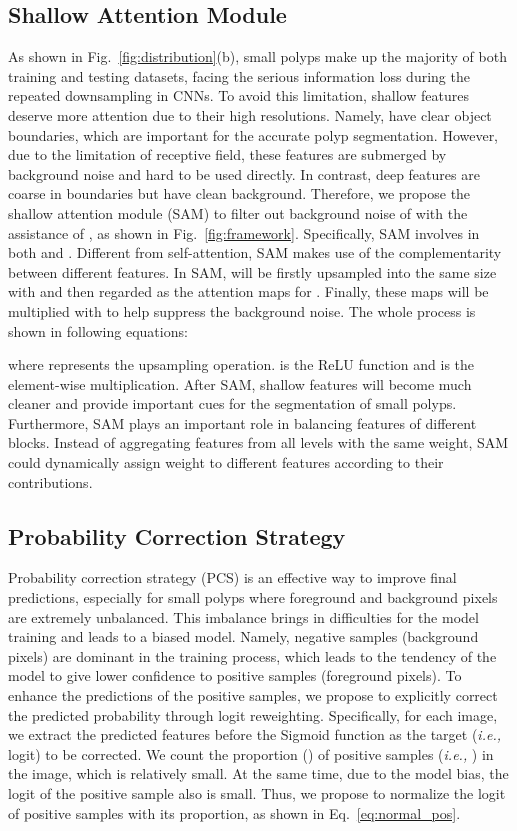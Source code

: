 \documentclass[runningheads]{llncs}
\begin{document}
\subsection{Shallow Attention Module}
As shown in Fig.~\ref{fig:distribution}(b), small polyps make up the majority of both training and testing datasets, facing the serious information loss during the repeated downsampling in CNNs. To avoid this limitation, shallow features  deserve more attention due to their high resolutions. Namely,  have clear object boundaries, which are important for the accurate polyp segmentation. However, due to the limitation of receptive field, these features are submerged by background noise and hard to be used directly. In contrast, deep features  are coarse in boundaries but have clean background. Therefore, we propose the shallow attention module (SAM) to filter out background noise of  with the assistance of , as shown in Fig.~\ref{fig:framework}.
Specifically, SAM involves in both  and . Different from self-attention, SAM makes use of the complementarity between different features. In SAM,  will be firstly upsampled into the same size with  and then regarded as the attention maps for . Finally, these maps will be multiplied with  to help suppress the background noise. The whole process is shown in following equations:

where  represents the upsampling operation.  is the ReLU function and  is the element-wise multiplication. After SAM, shallow features  will become much cleaner and provide important cues for the segmentation of small polyps. Furthermore, SAM plays an important role in balancing features of different blocks. Instead of aggregating features from all levels with the same weight, SAM could dynamically assign weight to different features according to their contributions.

\subsection{Probability Correction Strategy}
Probability correction strategy (PCS) is an effective way to improve final predictions, especially for small polyps where foreground and background pixels are extremely unbalanced. This imbalance brings in difficulties for the model training and leads to a biased model. Namely, negative samples (background pixels) are dominant in the training process, which leads to the tendency of the model to give lower confidence to positive samples (foreground pixels). To enhance the predictions of the positive samples, we propose to explicitly correct the predicted probability through logit reweighting. Specifically, for each image, we extract the predicted features before the Sigmoid function as the target ({\it i.e.,} logit) to be corrected. We count the proportion () of positive samples ({\it i.e.,} ) in the image, which is relatively small. At the same time, due to the model bias, the logit of the positive sample also is small. Thus, we propose to normalize the logit of positive samples with its proportion, as shown in Eq.~\ref{eq:normal_pos}. 
\end{document}

